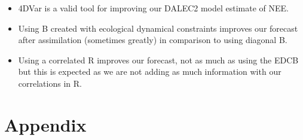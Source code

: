 \documentclass[11pt]{article}
\begin{document}
\begin{itemize}
\item 4DVar is a valid tool for improving our DALEC2 model estimate of NEE.
\item Using B created with ecological dynamical constraints improves our forecast after assimilation (sometimes greatly) in comparison to using diagonal B.
\item Using a correlated R improves our forecast, not as much as using the EDCB but this is expected as we are not adding as much information with our correlations in R.
\end{itemize}

{}
%

\section*{Appendix}
\end{document}
